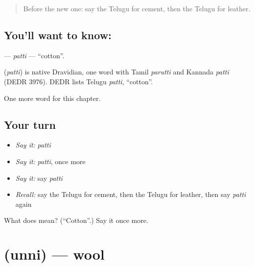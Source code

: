 \label{lesson:TE-C306-patti}



\begin{quote}
Before the new one: say the Telugu for cement, then the Telugu for leather.
\end{quote}

\subsection*{You'll want to know: }
\textbf{} — \emph{patti} — \textquotedblleft{}cotton\textquotedblright{}.

\begin{cousinweb}
\textbf{} (\emph{patti}) is native Dravidian, one word with Tamil \emph{parutti} and Kannada \emph{patti} (DEDR 3976). DEDR lists Telugu \emph{patti}, \textquotedblleft{}cotton\textquotedblright{}.
\end{cousinweb}

\begin{grammarlens}[title={What you've built}]
One more word for this chapter.
\end{grammarlens}

\subsection*{Your turn}
\begin{itemize}
\raggedright
  \item \emph{Say it:} \emph{patti}
  \item \emph{Say it:} \emph{patti}, once more
  \item \emph{Say it:} say \emph{patti}
  \item \emph{Recall:} say the Telugu for cement, then the Telugu for leather, then say \emph{patti} again
\end{itemize}

\begin{tcolorbox}[breakable,colback=teal!4,colframe=teal!35!black,title={Before you move on}]
What does  mean? (\textquotedblleft{}Cotton\textquotedblright{}.) Say it once more.
\end{tcolorbox}
\section[\texorpdfstring{\te{ఉన్ని} (unni)}{ఉన్ని (unni)}]{ (unni) — wool}

\label{lesson:TE-C306-unni}



